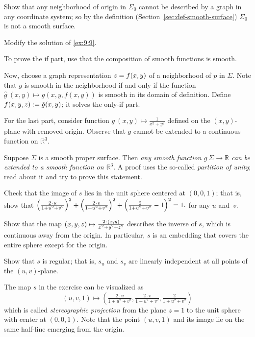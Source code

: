 \begin{multicols}{2}
Show that any neighborhood of origin in $\Sigma_0$ cannot be described by a graph in any coordinate system;
so by the definition (Section~\ref{sec:def-smooth-surface}) $\Sigma_0$ is not a smooth surface.

 Modify the solution of \ref{ex:9:9}.

To prove the if part, use that the composition of smooth functions is smooth.

Now, choose a graph representation $z\z=f(x,y)$ of a neighborhood of $p$ in $\Sigma$.
Note that $g$ is smooth in the neighborhood if and only if the function $\hat g\:(x,y)\mapsto g(x,y,f(x,y))$ is smooth in its domain of definition.
Define $f(x,y,z)\z\df \hat g(x,y)$; it solves the only-if part.

For the last part, consider function $g\:(x,y)\mapsto\tfrac1{x^2+y^2}$ defined on the $(x,y)$-plane with removed origin.
Observe that $g$ cannot be extended to a continuous function on $\mathbb{R}^3$.

 Suppose $\Sigma$ is a smooth proper surface.
Then \textit{any smooth function $g\:\Sigma\to\mathbb{R}$ can be extended to a smooth function on $\mathbb{R}^3$}.
A proof uses the so-called \emph{partition of unity};
read about it and try to prove this statement.


Check that the image of $s$ lies in the unit sphere centered at $(0,0,1)$;
that is, show that 
$\left(\tfrac{2\cdot u}{1+u^2+v^2}\right)^2
\z+
\left(\tfrac{2\cdot v}{1+u^2+v^2}\right)^2
\z+
\left(\tfrac{2}{1+u^2+v^2}-1\right)^2=1.
$
for any $u$ and~$v$.

Show that the map 
$(x,y,z)\z\mapsto \tfrac{2\cdot(x,y)}{x^2+y^2+z^2}$
describes the inverse of $s$, which is continuous away from the origin.
In particular, $s$ is an embedding that covers the entire sphere except for the origin.

Show that $s$ is regular; that is, $s_u$ and $s_v$ are linearly independent at all points of the $(u,v)$-plane.

The map $s$ in the exercise can be visualized as
\[(u,v,1)\mapsto (\tfrac{2\cdot u}{1+u^2+v^2},\tfrac{2\cdot v}{1+u^2+v^2},\tfrac{2}{1+u^2+v^2})\]
which is called \emph{stereographic projection} from the plane $z=1$ to the unit sphere with center at $(0,0,1)$.
Note that the point $(u,v,1)$ and its image lie on the same half-line emerging from the origin. 


\end{multicols}
